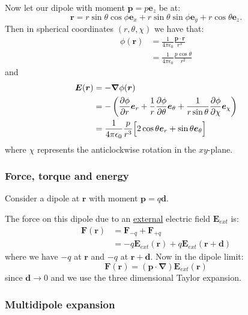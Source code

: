 \documentclass{article}
\begin{document}
Now let our dipole with moment $\boldsymbol{p}
=p\boldsymbol{e}_z$ be at:
$$\boldsymbol{r}=r\sin\theta\cos\phi\boldsymbol{e}_x
+r\sin\theta\sin\phi\boldsymbol{e}_y
+r\cos\theta\boldsymbol{e}_z.$$
Then in spherical coordinates $(r,\theta,\chi)$ we have that:
\begin{align*}
    \phi(\boldsymbol{r})
    &=\frac{1}{4\pi\epsilon_0}\frac{\boldsymbol{p}\cdot\boldsymbol{r}}{r^3} \\
    &=\frac{1}{4\pi\epsilon_0}\frac{p\cos\theta}{r^2}
\end{align*}
and
\begin{align*}
    \boldsymbol{E}(\boldsymbol{r})
    &=-\boldsymbol{\nabla}\phi
    (\boldsymbol{r}) \\
    &=-\left(\frac{\partial\phi}{\partial r}\boldsymbol{e}_r
    +\frac{1}{r}\frac{\partial\phi}{\partial\theta}\boldsymbol{e}_{\theta}
    +\frac{1}{r\sin\theta}\frac{\partial\phi}{\partial\chi}\boldsymbol{e}_{\chi}\right) \\
    &=\frac{1}{4\pi\epsilon_0}\frac{p}{r^3}
    \Bigl[2\cos\theta\boldsymbol{e}_r
    +\sin\theta\boldsymbol{e}_{\theta}\Bigr]
\end{align*}
where $\chi$ represents the anticlockwise rotation
in the $xy$-plane.

\newpage

\subsubsection{Force, torque and energy}
Consider a dipole at $\boldsymbol{r}$ with moment $\boldsymbol{p}=q\boldsymbol{d}$.

The force on this dipole due to an
\underline{external} electric field $\boldsymbol{E}_{ext}$ is:
\begin{align*}
    \boldsymbol{F}(\boldsymbol{r})
    &=\boldsymbol{F}_{-q}+\boldsymbol{F}_{+q} \\
    &=-q\boldsymbol{E}_{ext}(\boldsymbol{r})
    +q\boldsymbol{E}_{ext}(\boldsymbol{r}+\boldsymbol{d})
\end{align*}
where we have $-q$ at $\boldsymbol{r}$ and $-q$ at $\boldsymbol{r}+\boldsymbol{d}$.
Now in the dipole limit:
$$\boldsymbol{F}(\boldsymbol{r})
=(\boldsymbol{p}\cdot\boldsymbol{\nabla})
\boldsymbol{E}_{ext}(\boldsymbol{r})$$
since $\boldsymbol{d}\rightarrow0$ and we use the three dimensional Taylor expansion.

\subsubsection{Multidipole expansion}
\end{document}
